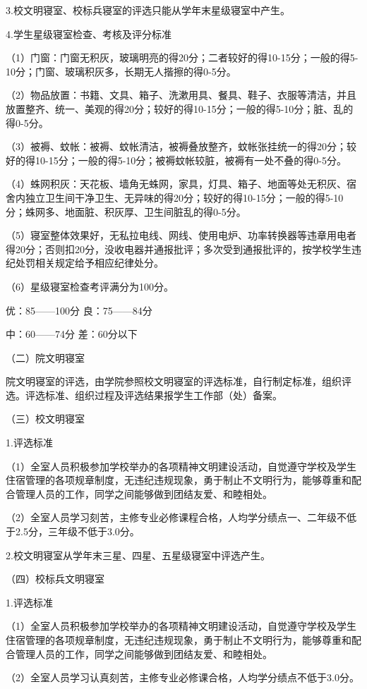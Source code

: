 \documentclass[UTF8,12pt,a4paper]{report}
\begin{document}
3.校文明寝室、校标兵寝室的评选只能从学年末星级寝室中产生。

4.学生星级寝室检查、考核及评分标准

（1）门窗：门窗无积灰，玻璃明亮的得20分；二者较好的得10-15分；一般的得5-10分；门窗、玻璃积灰多，长期无人揩擦的得0-5分。

（2）物品放置：书籍、文具、箱子、洗漱用具、餐具、鞋子、衣服等清洁，并且放置整齐、统一、美观的得20分；较好的得10-15分；一般的得5-10分；脏、乱的得0-5分。

（3）被褥、蚊帐：被褥、蚊帐清洁，被褥叠放整齐，蚊帐张挂统一的得20分；较好的得10-15分；一般的得5-10分；被褥蚊帐较脏，被褥有一处不叠的得0-5分。

（4）蛛网积灰：天花板、墙角无蛛网，家具，灯具、箱子、地面等处无积灰、宿舍内独立卫生间干净卫生、无异味的得20分；较好的得10-15分；一般的得5-10分；蛛网多、地面脏、积灰厚、卫生间脏乱的得0-5分。

（5）寝室整体效果好，无私拉电线、网线、使用电炉、功率转换器等违章用电者得20分；否则扣20分，没收电器并通报批评；多次受到通报批评的，按学校学生违纪处罚相关规定给予相应纪律处分。

（6）星级寝室检查考评满分为100分。

优：85——100分 良：75——84分

中：60——74分 差：60分以下

（二）院文明寝室

院文明寝室的评选，由学院参照校文明寝室的评选标准，自行制定标准，组织评选。评选标准、组织过程及评选结果报学生工作部（处）备案。

（三）校文明寝室

1.评选标准

（1）全室人员积极参加学校举办的各项精神文明建设活动，自觉遵守学校及学生住宿管理的各项规章制度，无违纪违规现象，勇于制止不文明行为，能够尊重和配合管理人员的工作，同学之间能够做到团结友爱、和睦相处。

（2）全室人员学习刻苦，主修专业必修课程合格，人均学分绩点一、二年级不低于2.5分，三年级不低于3.0分。

2.校文明寝室从学年末三星、四星、五星级寝室中评选产生。

（四）校标兵文明寝室

1.评选标准

（1）全室人员积极参加学校举办的各项精神文明建设活动，自觉遵守学校及学生住宿管理的各项规章制度，无违纪违规现象，勇于制止不文明行为，能够尊重和配合管理人员的工作，同学之间能够做到团结友爱、和睦相处。

（2）全室人员学习认真刻苦，主修专业必修课合格，人均学分绩点不低于3.0分。
\end{document}
